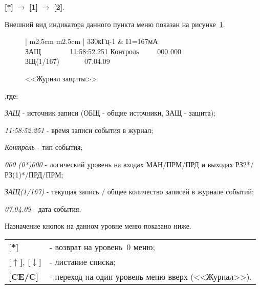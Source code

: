 \textbf{[*]} $\rightarrow$ \textbf{[1]} $\rightarrow$ \textbf{[2]}.

Внешний вид индикатора данного пункта меню показан на рисунке~\ref{fig:journal_def}.
 
 \begin{figure}[H]
 	\centering
		
	\begin{tabular}{| m{2.5cm}  m{2.5cm} |}
		\firsthline
		330кГц-1	& \raggedleft I1=167мА				\tabularnewline 
		 {ЗАЩ~~~~~~~~11:58:52.251} 	\tabularnewline
		 {Контроль~~~~~000 000} 	\tabularnewline 
		 {ЗЩ(1/167)~~~~~~~07.04.09}	\tabularnewline 
		\lasthline
	\end{tabular} 
	
	\caption{<<Журнал защиты>>}
	\label{fig:journal_def}
\end{figure}

\begin{ESKDexplanation}[1.5cm]
	\item[,где:]
	\item {\it ЗАЩ} - источник записи (ОБЩ - общие источники, ЗАЩ - защита);
	\item {\it 11:58:52.251} - время записи события в журнал;
	\item {\it Контроль} - тип события;
	\item {\it 000 (0*)000} - логический уровень на входах МАН/ПРМ/ПРД  и выходах РЗ2*/РЗ(1)*/ПРД/ПРМ;
	\item {\it ЗАЩ(1/167)} - текущая запись / общее количество записей в журнале событий;
	\item {\it 07.04.09} - дата события.
\end{ESKDexplanation}

Назначение кнопок на данном уровне меню показано ниже.
\begin{center}
	\begin{tabular}{p{2cm} p{15cm}}
		\textbf{[*]} 	& - возврат на уровень~0 меню; \tabularnewline
		\textbf{[$\uparrow$]}, \textbf{[$\downarrow$]}  & - листание списка; \tabularnewline
		\textbf{[CE/C]} & - переход на один уровень меню вверх (<<Журнал>>). \tabularnewline				
	\end{tabular}
\end{center} 